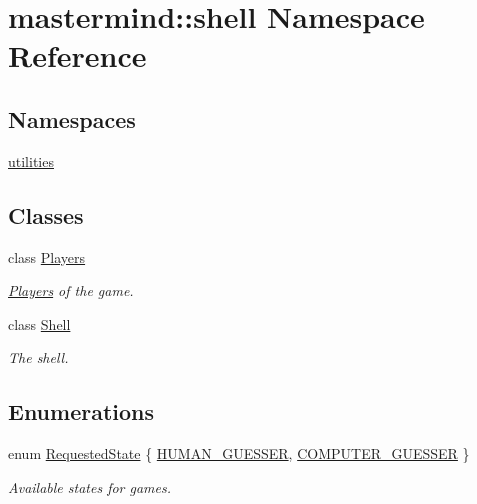 \hypertarget{namespacemastermind_1_1shell}{}\section{mastermind\+:\+:shell Namespace Reference}
\label{namespacemastermind_1_1shell}
\subsection*{Namespaces}
\begin{DoxyCompactItemize}
\item 
 \hyperlink{namespacemastermind_1_1shell_1_1utilities}{utilities}
\end{DoxyCompactItemize}
\subsection*{Classes}
\begin{DoxyCompactItemize}
\item 
class \hyperlink{classmastermind_1_1shell_1_1_players}{Players}
\begin{DoxyCompactList}\small\item\em \hyperlink{classmastermind_1_1shell_1_1_players}{Players} of the game. \end{DoxyCompactList}\item 
class \hyperlink{classmastermind_1_1shell_1_1_shell}{Shell}
\begin{DoxyCompactList}\small\item\em The shell. \end{DoxyCompactList}\end{DoxyCompactItemize}
\subsection*{Enumerations}
\begin{DoxyCompactItemize}
\item 
enum \hyperlink{namespacemastermind_1_1shell_ad060dfaf42b2c0f7827708f0d0046ede}{Requested\+State} \{ \hyperlink{namespacemastermind_1_1shell_ad060dfaf42b2c0f7827708f0d0046edeacc5ce9ad68fd8bcf63c6431048467ac2}{H\+U\+M\+A\+N\+\_\+\+G\+U\+E\+S\+S\+ER}, 
\hyperlink{namespacemastermind_1_1shell_ad060dfaf42b2c0f7827708f0d0046edea3853901e4a57fe6d139724873c112ed8}{C\+O\+M\+P\+U\+T\+E\+R\+\_\+\+G\+U\+E\+S\+S\+ER}
 \}\begin{DoxyCompactList}\small\item\em Available states for games. \end{DoxyCompactList}
\end{DoxyCompactItemize}
